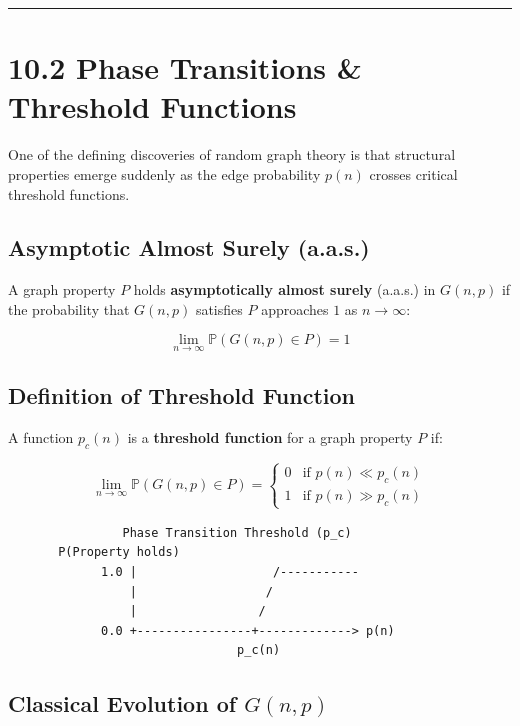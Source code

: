 \documentclass[
]{book}
\theoremstyle{definition}
\theoremstyle{definition}
\theoremstyle{definition}
\theoremstyle{definition}
\theoremstyle{remark}
\begin{document}
\begin{center}\rule{0.5\linewidth}{0.5pt}\end{center}

\section{10.2 Phase Transitions \& Threshold Functions}\label{phase-transitions-threshold-functions}

One of the defining discoveries of random graph theory is that structural properties emerge suddenly as the edge probability \(p(n)\) crosses critical threshold functions.

\subsection{Asymptotic Almost Surely (a.a.s.)}\label{asymptotic-almost-surely-a.a.s.}

A graph property \(P\) holds \textbf{asymptotically almost surely} (a.a.s.) in \(G(n, p)\) if the probability that \(G(n, p)\) satisfies \(P\) approaches \(1\) as \(n \to \infty\):

\[\lim_{n \to \infty} \mathbb{P}(G(n, p) \in P) = 1\]

\subsection{Definition of Threshold Function}\label{definition-of-threshold-function}

A function \(p_c(n)\) is a \textbf{threshold function} for a graph property \(P\) if:

\[\lim_{n \to \infty} \mathbb{P}(G(n, p) \in P) = \begin{cases} 0 & \text{if } p(n) \ll p_c(n) \\ 1 & \text{if } p(n) \gg p_c(n) \end{cases}\]

\begin{verbatim}
                Phase Transition Threshold (p_c)
       P(Property holds)
             1.0 |                   /-----------
                 |                  /
                 |                 /
             0.0 +----------------+-------------> p(n)
                                p_c(n)
\end{verbatim}

\subsection{\texorpdfstring{Classical Evolution of \(G(n, p)\)}{Classical Evolution of G(n, p)}}\label{classical-evolution-of-gn-p}
\end{document}

